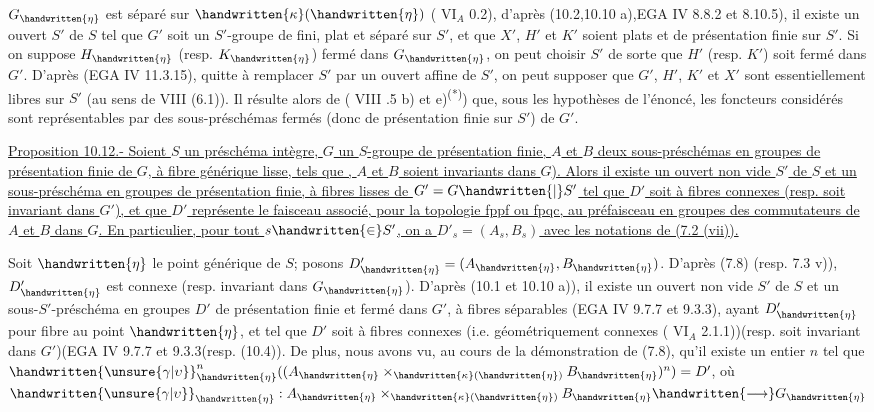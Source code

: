 $G_{\handwritten{\eta}}$ est séparé sur $\handwritten{\kappa}(\handwritten{\eta})$ ( $\mathrm{VI}_A$ 0.2), d'après (10.2,10.10 a),EGA IV 8.8.2 et 8.10.5), il existe un ouvert $S'$ de $S$ tel que $G'$ soit un $S'$-groupe de  fini, plat et séparé sur $S'$, et que $X'$, $H'$ et $K'$ soient plats et de présentation finie sur $S'$. Si on suppose $H_{\handwritten{\eta}}$ (resp. $K_{\handwritten{\eta}}$) fermé dans $G_{\handwritten{\eta}}$, on peut choisir $S'$ de sorte que $H'$ (resp. $K'$) soit fermé dans $G'$. D'après (EGA IV 11.3.15), quitte à remplacer $S'$ par un ouvert affine de $S'$, on peut supposer que $G'$, $H'$, $K'$ et $X'$ sont essentiellement libres sur $S'$ (au sens de  VIII (6.1)). Il résulte alors de ( VIII .5 b) et e)\textsuperscript{(*)}) que, sous les hypothèses de l'énoncé, les foncteurs considérés sont représentables par des sous-préschémas fermés (donc de présentation finie sur $S'$) de $G'$.

\uline{Proposition 10.12.- Soient $S$ un préschéma intègre, $G$ un  $S$-groupe de présentation finie, $A$ et $B$ deux sous-préschémas en groupes de présentation finie de $G$, à fibre générique lisse, tels que ,  $A$ et $B$ soient invariants dans $G$). Alors il existe un ouvert non vide $S'$ de $S$ et un sous-préschéma en groupes de présentation finie, à fibres lisses  de $G'=G\handwritten{|}S'$\handwritten{,} tel que $D'$ soit  à fibres connexes (resp. soit invariant dans $G'$), et que $D'$ représente le faisceau associé, pour la topologie fppf ou fpqc, au préfaisceau en groupes des commutateurs de $A$ et $B$ dans $G$. En particulier, pour tout $s\handwritten{\in}S'$, on a $D'_s=(A_s,B_s)$ avec les notations de (7.2 (vii)).}

Soit $\handwritten{\eta}$ le point générique de $S$; posons $D'_{\handwritten{\eta}}=(A_{\handwritten{\eta}},B_{\handwritten{\eta}})$. D'après (7.8) (resp. 7.3 v)), $D'_{\handwritten{\eta}}$ est connexe (resp. invariant dans $G_{\handwritten{\eta}}$). D'après (10.1 et 10.10 a)), il existe un ouvert non vide $S'$ de $S$ et un sous-$S'$-préschéma en groupes $D'$ de présentation finie et fermé dans $G'$, à fibres séparables (EGA IV 9.7.7 et 9.3.3), ayant $D'_{\handwritten{\eta}}$ pour fibre au point $\handwritten{\eta}$, et tel que $D'$ soit à fibres connexes (i.e. géométriquement connexes ( $\mathrm{VI}_A$ 2.1.1))(resp. soit invariant dans $G'$)(EGA IV 9.7.7 et 9.3.3\inserted{\handwritten{)}}(resp. (10.4)). De plus, nous avons vu, au cours de la démonstration de (7.8), qu'il existe un entier $n$ tel que $\handwritten{\unsure{\gamma|\upsilon}}_{\handwritten{\eta}}^n((A_{\handwritten{\eta}}\times_{\handwritten{\kappa}(\handwritten{\eta})}B_{\handwritten{\eta}})^n)=D'$, où $\handwritten{\unsure{\gamma|\upsilon}}_{\handwritten{\eta}}:A_{\handwritten{\eta}}\times_{\handwritten{\kappa}(\handwritten{\eta})}B_{\handwritten{\eta}}\handwritten{\longrightarrow}G_{\handwritten{\eta}}$

\par\noindent\handwritten{\rule{\linewidth}{0.3pt}}\par
{}\par
